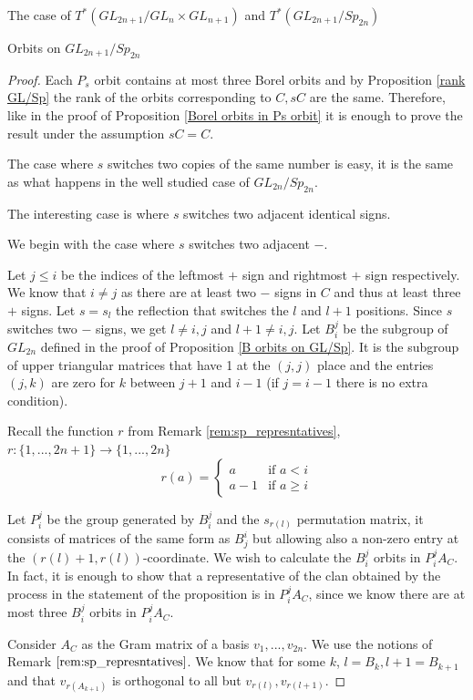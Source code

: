 \documentclass[12pt]{article}
\theoremstyle{plain}
\theoremstyle{definition}
\begin{document}
\begin{subsection}{The case of $T^*(GL_{2n+1}/GL_n\times GL_{n+1})$ and $T^*(GL_{2n+1}/Sp_{2n})$}
\begin{subsubsection}{Orbits on $GL_{2n+1}/Sp_{2n}$}
\begin{proof}
    Each $P_s$ orbit contains at most three Borel orbits and by Proposition \ref{rank GL/Sp} the rank of the orbits corresponding to $C,sC$ are the same. Therefore, like in the proof of Proposition \ref{Borel orbits in Ps orbit} it is enough to prove the result under the assumption $sC=C$.

    The case where $s$ switches two copies of the same number is easy, it is the same as what happens in the well studied case of $GL_{2n}/Sp_{2n}$.

    The interesting case is where $s$ switches two adjacent identical signs. 
    
    We begin with the case where $s$ switches two adjacent $-$.

    Let $j\leq i$ be the indices of the leftmost $+$ sign and rightmost $+$ sign respectively. We know that $i\neq j$ as there are at least two $-$ signs in $C$ and thus at least three $+$ signs. Let $s=s_l$ the reflection that switches the $l$ and $l+1$ positions. Since $s$ switches two $-$ signs, we get $l\neq i,j$ and $l+1\neq i,j$. Let $B^{j}_{i}$ be the subgroup of $GL_{2n}$ defined in the proof of Proposition \ref{B orbits on GL/Sp}. It is the subgroup of upper triangular matrices that have 1 at the $(j,j)$ place and the entries $(j,k)$ are zero for $k$ between $j+1$ and $i-1$ (if $j=i-1$ there is no extra condition). 
    
    Recall the function $r$ from Remark \ref{rem:sp_represntatives}, $r:\{1,...,2n+1\}\rightarrow \{1,...,2n\}$ \[
r(a)=
\begin{cases}
a & \text{if } a< i\\
a-1 & \text{if } a\geq i
\end{cases}
\]

    
    Let $P^{j}_{i}$ be the group generated by $B^{j}_{i}$ and the $s_{r(l)}$ permutation matrix, it consists of matrices of the same form as $B_{j}^{i}$ but allowing also a non-zero entry at the $(r(l)+1,r(l))$-coordinate. We wish to calculate the $B_{i}^{j}$ orbits in $P^{j}_{i}A_{C}$. In fact, it is enough to show that a representative of the clan obtained by the process in the statement of the proposition is in $P^{j}_{i}A_{C}$, since we know there are at most three $B_{i}^{j}$ orbits in $P^{j}_{i}A_{C}$.


    Consider $A_{C}$ as the Gram matrix of a basis $v_{1},...,v_{2n}$. We use the notions of Remark $\ref{rem:sp_represntatives}$. We know that for some $k$, $l=B_{k},l+1=B_{k+1}$ and that $v_{r(A_{k+1})}$ is orthogonal to all but $v_{r(l)},v_{r(l+1)}$.



\end{proof}
\end{subsubsection}
\end{subsection}
\end{document}
